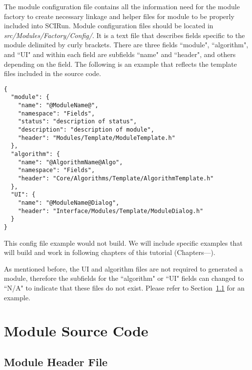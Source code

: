\documentclass[fleqn,11pt,openany]{book}
\begin{document}
The module configuration file contains all the information need for the module factory to create necessary linkage and helper files for module to be properly included into SCIRun.  
Module configuration files should be located in \emph{src/Modules/Factory/Config/}.  
It is a text file that describes fields specific to the module delimited by curly brackets.  
There are three fields ``module", ``algorithm", and ``UI" and within each field are subfields ``name" and ``header", and others depending on the field.  
The following is an example that reflects the template files included in the source code.
\begin{verbatim}
{
  "module": {
    "name": "@ModuleName@",
    "namespace": "Fields",
    "status": "description of status",
    "description": "description of module",
    "header": "Modules/Template/ModuleTemplate.h"
  },
  "algorithm": {
    "name": "@AlgorithmName@Algo",
    "namespace": "Fields",
    "header": "Core/Algorithms/Template/AlgorithmTemplate.h"
  },
  "UI": {
    "name": "@ModuleName@Dialog",
    "header": "Interface/Modules/Template/ModuleDialog.h"
  }
}
\end{verbatim}
This config file example would not build.  
We will include specific examples that will build and work in following chapters of this tutorial (Chapters---). %

As mentioned before, the UI and algorithm files are not required to generated a module, therefore the subfields for the ``algorithm" or ``UI" fields can changed to ``N/A" to indicate that these files do not exist.  
Please refer to Section~\ref{} for an example.  %

\section{Module Source Code}
\label{sec:module}

\subsection{Module Header File}
\end{document}
